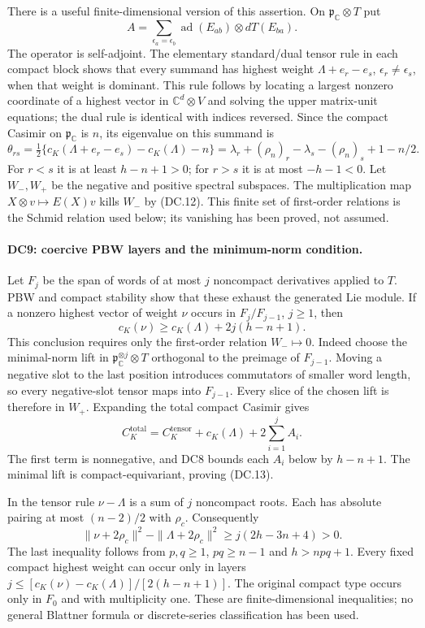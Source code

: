 There is a useful finite-dimensional version of this assertion.  On
$\mathfrak p_{\mathbb C}\otimes T$ put
\[
 A=\sum_{\epsilon_a=\epsilon_b}
                \operatorname{ad}(E_{ab})\otimes dT(E_{ba}).
\]
The operator is self-adjoint.  The elementary standard/dual tensor rule
in each compact block shows that every summand has highest weight
$\Lambda+e_r-e_s$, $\epsilon_r\ne\epsilon_s$, when that weight is
dominant.  This rule follows by locating a largest nonzero coordinate
of a highest vector in $\mathbb C^d\otimes V$ and solving the upper
matrix-unit equations; the dual rule is identical with indices reversed.
Since the compact Casimir on $\mathfrak p_{\mathbb C}$ is $n$, its
eigenvalue on this summand is
\[
 \theta_{rs}=\tfrac12\{c_K(\Lambda+e_r-e_s)-c_K(\Lambda)-n\}
 =\lambda_r+(\rho_n)_r-\lambda_s-(\rho_n)_s+1-n/2.
\]
For $r<s$ it is at least $h-n+1>0$; for $r>s$ it is at most $-h-1<0$.
Let $W_-,W_+$ be the negative and positive spectral subspaces.  The
multiplication map $X\otimes v\mapsto E(X)v$ kills $W_-$ by (DC.12).
This finite set of first-order relations is the Schmid relation used
below; its vanishing has been proved, not assumed.

\paragraph{DC9: coercive PBW layers and the minimum-norm condition.}
\label{claim:DC9}
Let $F_j$ be the span of words of at most $j$ noncompact derivatives
applied to $T$.  PBW and compact stability show that these exhaust the
generated Lie module.  If a nonzero highest vector of weight $\nu$
occurs in $F_j/F_{j-1}$, $j\ge1$, then
\[
 c_K(\nu)\ge c_K(\Lambda)+2j(h-n+1).                           \tag{DC.13}
\]
This conclusion requires only the first-order relation $W_-\mapsto0$.
Indeed choose the minimal-norm lift in
$\mathfrak p_{\mathbb C}^{\otimes j}\otimes T$ orthogonal to the
preimage of $F_{j-1}$.  Moving a negative slot to the last position
introduces commutators of smaller word length, so every negative-slot
tensor maps into $F_{j-1}$.  Every slice of the chosen lift is therefore
in $W_+$.  Expanding the total compact Casimir gives
\[
 C_K^{\mathrm{total}}=C_K^{\mathrm{tensor}}+c_K(\Lambda)
                                      +2\sum_{i=1}^j A_i.
\]
The first term is nonnegative, and DC8 bounds each $A_i$ below by
$h-n+1$.  The minimal lift is compact-equivariant, proving (DC.13).

In the tensor rule $\nu-\Lambda$ is a sum of $j$ noncompact roots.
Each has absolute pairing at most $(n-2)/2$ with $\rho_c$.
Consequently
\[
 \|\nu+2\rho_c\|^2-\|\Lambda+2\rho_c\|^2
 \ge j(2h-3n+4)>0.                                           \tag{DC.14}
\]
The last inequality follows from $p,q\ge1$, $pq\ge n-1$ and
$h>npq+1$.  Every fixed compact highest weight can occur only in
layers
$j\le[c_K(\nu)-c_K(\Lambda)]/[2(h-n+1)]$.
The original compact type occurs only in $F_0$ and with multiplicity
one.  These are finite-dimensional inequalities; no general
Blattner formula or discrete-series classification has been used.


